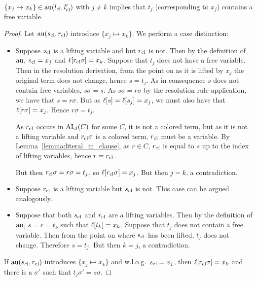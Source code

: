 \documentclass[,%
	paper=a4,%
	twoside=false,%
	liststotoc,
	bibtotoc,
	draft=false,%
	numbers=noendperiod
]{scrartcl}
\begin{document}
\begin{lemma}
	$\{x_j \mapsto x_k\} \in \operatorname{au}(l_\mathrm{cl}, l_\mathrm{cl}')$ with $j\neq k$ implies that $t_j$ (corresponding to $x_j$) contains a free variable.
\end{lemma}
\begin{proof}
	Let  $\operatorname{au}(s_\mathrm{cl}, r_\mathrm{cl})$ introduce $\{x_j \mapsto x_k\}$.
	We perform a case distinction:
	\begin{itemize}
			\item Suppose $s_\mathrm{cl}$ is a lifting variable and but $r_\mathrm{cl}$ is not.
	Then by the definition of $\operatorname{au}$, $s_\mathrm{cl} = x_j$ and $\ell[r_\mathrm{cl}\sigma] = x_k$.
	Suppose that $t_j$ does not have a free variable.
	Then in the resolution derivation, from the point on as it is lifted by $x_j$ the original term does not change, hence $s = t_j$. As in consequence $s$ does not contain free variables, $s\sigma = s$.
	As $s\sigma = r\sigma$ by the resolution rule application, we have that $s = r\sigma$.
	But as $\ell[s] = \ell[s_j] = x_j$, we must also have that $\ell[r\sigma] = x_j$.
	Hence $r\sigma = t_j$.

	As $r_\mathrm{cl}$ occurs in $\operatorname{AI}_\mathrm{cl}(C)$ for some $C$, it is not a colored term, but as it is not a lifting variable and $r_\mathrm{cl}\sigma$ is a colored term, $r_\mathrm{cl}$ must be a variable.
	By Lemma~\ref{lemma:literal_in_clause}, as $r \in C$, $r_\mathrm{cl}$ is equal to $s$ up to the index of lifting variables, hence $r = r_\mathrm{cl}$.
	
	But then $r_\mathrm{cl}\sigma = r\sigma = t_j$, so $\ell[r_\mathrm{cl}\sigma] = x_j$. But then $j=k$, a contradiction.

			\item Suppose $r_\mathrm{cl}$ is a lifting variable but $s_\mathrm{cl}$ is not. This case can be argued analogously.

			\item Suppose that both $s_\mathrm{cl}$ and $r_\mathrm{cl}$ are a lifting variables.
				Then by the definition of $\operatorname{au}$, $s = r = t_k$ such that $\ell[t_k] = x_k$.
				Suppose that $t_j$ does not contain a free variable. Then from the point on where $s_\mathrm{cl}$ has been lifted, $t_j$ does not change. Therefore $s = t_j$. But then $k=j$, a contradiction.

	\end{itemize}


	\clearpage
	If $\operatorname{au}(s_\mathrm{cl}, r_\mathrm{cl})$ introduces $\{x_j \mapsto x_k\}$ and w.l.o.g.\ $s_\mathrm{cl} =x_j$, then $\ell[r_\mathrm{cl}\sigma] = x_k$
	and there is a $\sigma'$ such that $t_j\sigma' = s\sigma$.



\end{proof}
\end{document}
